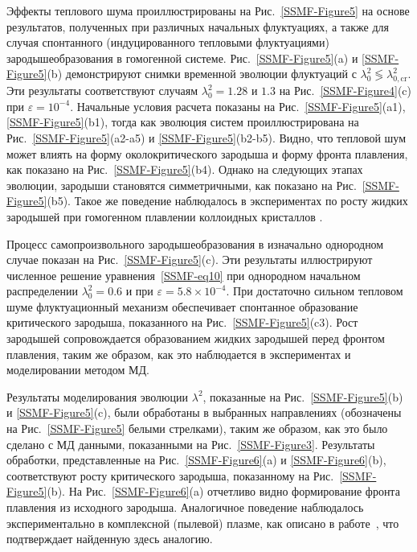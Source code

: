 Эффекты теплового шума проиллюстрированы на Рис.~\ref{SSMF-Figure5} на основе результатов, полученных при различных начальных флуктуациях, а также для случая спонтанного (индуцированного тепловыми флуктуациями) зародышеобразования в гомогенной системе.
Рис.~\ref{SSMF-Figure5}(a) и \ref{SSMF-Figure5}(b) демонстрируют снимки временной эволюции флуктуаций с $\lambda^2_0 \lessgtr \lambda^2_{0,\mathrm{cr}}$.
Эти результаты соответствуют случаям $\lambda_0^2 =1.28$ и $1.3$ на Рис.~\ref{SSMF-Figure4}(c) при $\varepsilon = 10^{-4}$.
Начальные условия расчета показаны на Рис.~\ref{SSMF-Figure5}(a1), \ref{SSMF-Figure5}(b1),
тогда как эволюция систем проиллюстрирована на Рис.~\ref{SSMF-Figure5}(a2-a5) и \ref{SSMF-Figure5}(b2-b5).
Видно, что тепловой шум может влиять на форму околокритического зародыша и форму фронта плавления, как показано на Рис.~\ref{SSMF-Figure5}(b4).
Однако на следующих этапах эволюции, зародыши становятся симметричными, как показано на Рис.~\ref{SSMF-Figure5}(b5).
Такое же поведение наблюдалось в экспериментах по росту жидких зародышей при гомогенном плавлении коллоидных кристаллов \cite{10.1038/ncomms7942}.

Процесс самопроизвольного зародышеобразования в изначально однородном случае показан на Рис.~\ref{SSMF-Figure5}(c).
Эти результаты иллюстрируют численное решение уравнения~\eqref{SSMF-eq10} при однородном начальном распределении $\lambda_0^2 = 0.6$ и при $\varepsilon=5.8\times10^{-4}$.
При достаточно сильном тепловом шуме флуктуационный механизм обеспечивает спонтанное образование критического зародыша, показанного на Рис.~\ref{SSMF-Figure5}(c3).
Рост зародышей сопровождается образованием жидких зародышей перед фронтом плавления, таким же образом, как это наблюдается в экспериментах и моделировании методом МД.


Результаты моделирования эволюции $\lambda^2$, показанные на Рис.~\ref{SSMF-Figure5}(b) и \ref{SSMF-Figure5}(c), были обработаны в выбранных направлениях (обозначены на Рис.~\ref{SSMF-Figure5} белыми стрелками), таким же образом, как это было сделано с МД данными, показанными на Рис.~\ref{SSMF-Figure3}.
Результаты обработки, представленные на Рис.~\ref{SSMF-Figure6}(a) и \ref{SSMF-Figure6}(b), соответствуют росту критического зародыша, показанному на Рис.~\ref{SSMF-Figure5}(b). На Рис.~\ref{SSMF-Figure6}(a) отчетливо видно формирование фронта плавления из исходного зародыша.
Аналогичное поведение наблюдалось экспериментально в комплексной (пылевой) плазме, как описано в работе~\cite{10.1103/physreve.97.043206}, что подтверждает найденную здесь аналогию.

